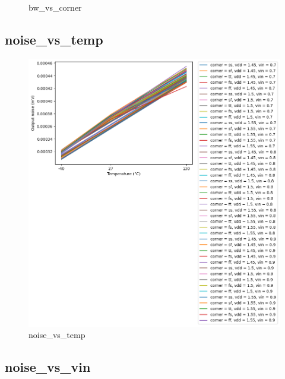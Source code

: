 \documentclass[
  a4paper,
  DIV=11,
  numbers=noendperiod]{scrartcl}
\begin{document}
\begin{tcolorbox}
\begin{figure}[H]
{}

\caption{bw\_vs\_corner}

\end{figure}%

\subsection*{noise\_vs\_temp}\label{noise_vs_temp}

\begin{figure}[H]

{\centering \includegraphics{./cace/_docs/ota-5t/schematic/noise_vs_temp.png}

}

\caption{noise\_vs\_temp}

\end{figure}%

\subsection*{noise\_vs\_vin}\label{noise_vs_vin}

\begin{figure}[H]


\end{figure}
\end{tcolorbox}
\end{document}
